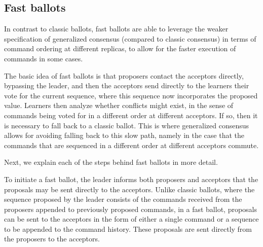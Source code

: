\subsection{Fast ballots} 

In contrast to classic ballots, fast ballots are able to leverage the weaker specification of generalized consensus (compared to classic consensus) in terms of command ordering at different replicas, to allow for the faster execution of commands in some cases.\par

The basic idea of fast ballots is that proposers contact the acceptors directly, bypassing the leader, and then the acceptors send directly to the learners their vote for the current sequence, where this
sequence now incorporates the proposed value. Learners then analyze whether conflicts might exist, in the sense of commands being voted for in a different order at different acceptors. If so, then it is
necessary to fall back to a classic ballot. This is where generalized consensus allows for avoiding falling back to this slow path, namely in the case that the commands that are sequenced in a different order at different acceptors commute.\par
Next, we explain each of the steps behind fast ballots in more detail.

To initiate a fast ballot, the leader informs both proposers and acceptors that the proposals may be sent directly to the acceptors. Unlike classic ballots, where the sequence proposed by the leader consists of the commands received from the proposers appended to previously proposed commands, in a fast ballot, proposals can be sent to the acceptors in the form of either a single command or a sequence to be appended to the command history. These proposals are sent directly from the proposers to the acceptors.\par

